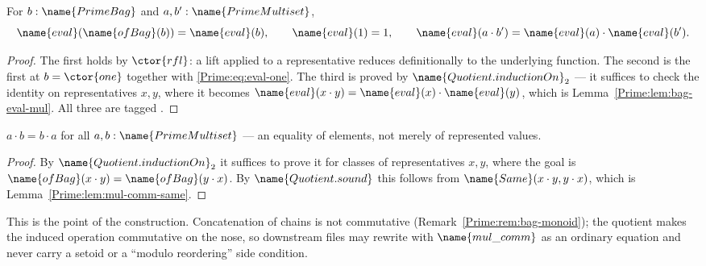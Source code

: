 \begin{lemma}
\label{Prime:lem:quot-eval}
For $b : \name{PrimeBag}$ and $a, b' : \name{PrimeMultiset}$,
\[
  \name{eval}(\name{ofBag}(b)) = \name{eval}(b),
  \qquad
  \name{eval}(1) = 1,
  \qquad
  \name{eval}(a \cdot b') = \name{eval}(a) \cdot \name{eval}(b').
\]
\end{lemma}

\begin{proof}
The first holds by $\ctor{rfl}$: a lift applied to a representative reduces
definitionally to the underlying function.  The second is the first at
$b = \ctor{one}$ together with \eqref{Prime:eq:eval-one}.  The third is proved by
$\name{Quotient.inductionOn}_2$ --- it suffices to check the identity on
representatives $x, y$, where it becomes
$\name{eval}(x \cdot y) = \name{eval}(x) \cdot \name{eval}(y)$, which is
Lemma~\ref{Prime:lem:bag-eval-mul}.  All three are tagged .
\end{proof}

\begin{proposition}
\label{Prime:prop:quot-comm}
$a \cdot b = b \cdot a$ for all $a, b : \name{PrimeMultiset}$ --- an equality
of elements, not merely of represented values.
\end{proposition}

\begin{proof}
By $\name{Quotient.inductionOn}_2$ it suffices to prove it for classes of
representatives $x, y$, where the goal is
$\name{ofBag}(x \cdot y) = \name{ofBag}(y \cdot x)$.  By
$\name{Quotient.sound}$ this follows from $\name{Same}(x \cdot y, y \cdot x)$,
which is Lemma~\ref{Prime:lem:mul-comm-same}.
\end{proof}

This is the point of the construction.  Concatenation of chains is not
commutative (Remark~\ref{Prime:rem:bag-monoid}); the quotient makes the induced
operation commutative on the nose, so downstream files may rewrite with
$\name{mul\_comm}$ as an ordinary equation and never carry a
setoid or a ``modulo reordering'' side condition.

